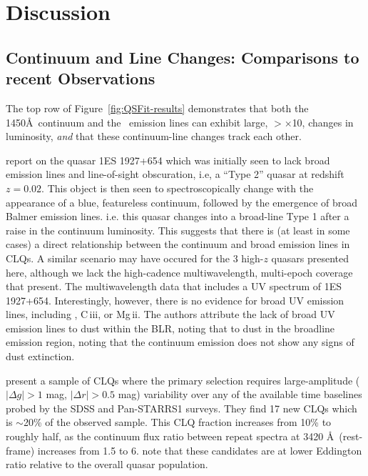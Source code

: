 \documentclass[fleqn,usenatbib]{mnras}
\begin{document}
\section{Discussion}
\subsection{Continuum and Line Changes: Comparisons to recent Observations}
The top row of Figure~\ref{fig:QSFit-results} demonstrates that
both the 1450\AA\ continuum and the \civ\ emission lines can
exhibit large, $>$$\times$10, changes in luminosity, {\it and}
that these continuum-line changes track each other. 

\citet{Trakhtenbrot2019} report on the quasar 1ES 1927+654 which was
initially seen to lack broad emission lines and line-of-sight
obscuration, i.e, a ``Type 2'' quasar at redshift $z=0.02$. This
object is then seen to spectroscopically change with the appearance of
a blue, featureless continuum, followed by the emergence of broad
Balmer emission lines.  i.e. this quasar changes into a broad-line
Type 1 after a raise in the continuum luminosity.  This suggests that
there is (at least in some cases) a direct relationship between the continuum
and broad emission lines in CLQs.  A similar scenario may have occured
for the 3 high-$z$ quasars presented here, although we lack the
high-cadence multiwavelength, multi-epoch coverage that
\citet{Trakhtenbrot2019} present.  The multiwavelength data that
\citet{Trakhtenbrot2019} includes a UV spectrum of 1ES 1927+654.
Interestingly, however, there is no evidence for broad UV emission lines, including
\civ, C\,{\sc iii}, or Mg\,{\sc ii}.  The authors attribute the lack of broad UV
emission lines to dust within the BLR, noting that to dust in the
broadline emission region, noting that the continuum emission does not
show any signs of dust extinction.

\citet{MacLeod2019} present a sample of CLQs where the primary
selection requires large-amplitude ($| \Delta g | > 1$ mag, $| \Delta
r | > 0.5$ mag) variability over any of the available time baselines
probed by the SDSS and Pan-STARRS1 surveys. They find 17 new CLQs
which is $\sim$20\% of the observed sample. This CLQ fraction
increases from 10\% to roughly half, as the continuum flux ratio
between repeat spectra at 3420 \AA\ (rest-frame) increases from 1.5 to
6. \citet{MacLeod2019} note that these candidates are at lower Eddington
ratio relative to the overall quasar population.
\end{document}
